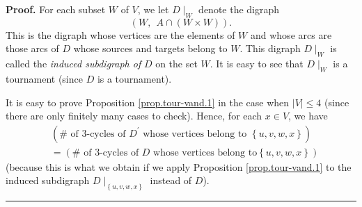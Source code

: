 \documentclass[numbers=enddot,12pt,final,onecolumn,notitlepage]{scrartcl}%
\numberwithin{exer}{subsection}
\theoremstyle{definition}
\newenvironment{proof}[1][Proof]{\noindent\textbf{#1.} }{\ \rule{0.5em}{0.5em}}
\newenvironment{noncompile}{}{}
\begin{document}
\begin{noncompile}


\begin{proof}
For each subset $W$ of $V$, we let $D\mid_{W}$ denote the digraph%
\[
\left(  W,\ \ A\cap\left(  W\times W\right)  \right)  .
\]
This is the digraph whose vertices are the elements of $W$ and whose arcs are
those arcs of $D$ whose sources and targets belong to $W$. This digraph
$D\mid_{W}$ is called the \emph{induced subdigraph of }$D$ on the set $W$. It
is easy to see that $D\mid_{W}$ is a tournament (since $D$ is a tournament).

It is easy to prove Proposition \ref{prop.tour-vand.1} in the case when
$\left\vert V\right\vert \leq4$ (since there are only finitely many cases to
check). Hence, for each $x\in V$, we have%
\begin{align*}
&  \left(  \#\text{ of }3\text{-cycles of }D^{\prime}\text{ whose vertices
belong to }\left\{  u,v,w,x\right\}  \right) \\
&  =\left(  \#\text{ of }3\text{-cycles of }D\text{ whose vertices belong to
}\left\{  u,v,w,x\right\}  \right)
\end{align*}
(because this is what we obtain if we apply Proposition \ref{prop.tour-vand.1}
to the induced subdigraph $D\mid_{\left\{  u,v,w,x\right\}  }$ instead of $D$).
\end{proof}
\end{noncompile}
\end{document}
